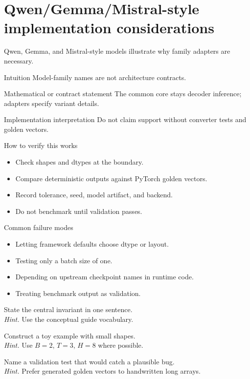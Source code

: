 \chapter{Qwen/Gemma/Mistral-style implementation considerations}
\label{ch:qwen-gemma-mistral}
Qwen, Gemma, and Mistral-style models illustrate why family adapters are necessary. \citep{qwen2024qwen25,gemma2024,jiang2023mistral}



\begin{intuitionbox}{Intuition}
Model-family names are not architecture contracts.
\end{intuitionbox}

\begin{definitionbox}{Mathematical or contract statement}
The common core stays decoder inference; adapters specify variant details.
\end{definitionbox}

\begin{implementationbox}{Implementation interpretation}
Do not claim support without converter tests and golden vectors.
\end{implementationbox}

\begin{verificationbox}{How to verify this works}
\begin{itemize}
\item Check shapes and dtypes at the boundary.
\item Compare deterministic outputs against PyTorch golden vectors.
\item Record tolerance, seed, model artifact, and backend.
\item Do not benchmark until validation passes.
\end{itemize}
\end{verificationbox}

\begin{warningbox}{Common failure modes}
\begin{itemize}
\item Letting framework defaults choose dtype or layout.
\item Testing only a batch size of one.
\item Depending on upstream checkpoint names in runtime code.
\item Treating benchmark output as validation.
\end{itemize}
\end{warningbox}

\begin{chapterexercises}
\item State the central invariant in one sentence.\\
\textit{Hint.} Use the conceptual guide vocabulary.
\item Construct a toy example with small shapes.\\
\textit{Hint.} Use $B=2$, $T=3$, $H=8$ where possible.
\item Name a validation test that would catch a plausible bug.\\
\textit{Hint.} Prefer generated golden vectors to handwritten long arrays.
\end{chapterexercises}

